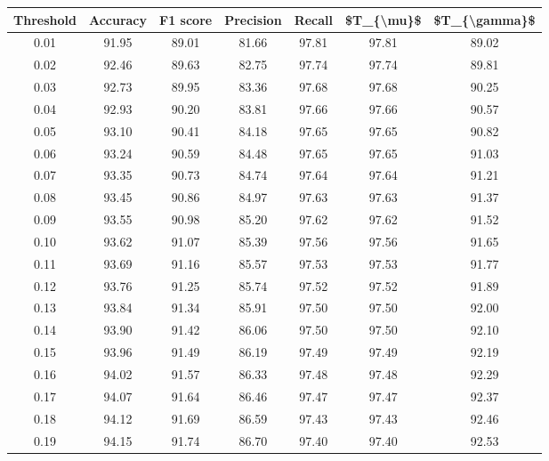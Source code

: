 \begin{tabular}{|c|c|c|c|c|c|c|}
\hline
 Threshold &  Accuracy &  F1 score &  Precision &  Recall &  \$T\_\{\textbackslash mu\}\$ &  \$T\_\{\textbackslash gamma\}\$ \\
\hline
      0.01 &     91.95 &     89.01 &      81.66 &   97.81 &      97.81 &         89.02 \\
      0.02 &     92.46 &     89.63 &      82.75 &   97.74 &      97.74 &         89.81 \\
      0.03 &     92.73 &     89.95 &      83.36 &   97.68 &      97.68 &         90.25 \\
      0.04 &     92.93 &     90.20 &      83.81 &   97.66 &      97.66 &         90.57 \\
      0.05 &     93.10 &     90.41 &      84.18 &   97.65 &      97.65 &         90.82 \\
      0.06 &     93.24 &     90.59 &      84.48 &   97.65 &      97.65 &         91.03 \\
      0.07 &     93.35 &     90.73 &      84.74 &   97.64 &      97.64 &         91.21 \\
      0.08 &     93.45 &     90.86 &      84.97 &   97.63 &      97.63 &         91.37 \\
      0.09 &     93.55 &     90.98 &      85.20 &   97.62 &      97.62 &         91.52 \\
      0.10 &     93.62 &     91.07 &      85.39 &   97.56 &      97.56 &         91.65 \\
      0.11 &     93.69 &     91.16 &      85.57 &   97.53 &      97.53 &         91.77 \\
      0.12 &     93.76 &     91.25 &      85.74 &   97.52 &      97.52 &         91.89 \\
      0.13 &     93.84 &     91.34 &      85.91 &   97.50 &      97.50 &         92.00 \\
      0.14 &     93.90 &     91.42 &      86.06 &   97.50 &      97.50 &         92.10 \\
      0.15 &     93.96 &     91.49 &      86.19 &   97.49 &      97.49 &         92.19 \\
      0.16 &     94.02 &     91.57 &      86.33 &   97.48 &      97.48 &         92.29 \\
      0.17 &     94.07 &     91.64 &      86.46 &   97.47 &      97.47 &         92.37 \\
      0.18 &     94.12 &     91.69 &      86.59 &   97.43 &      97.43 &         92.46 \\
      0.19 &     94.15 &     91.74 &      86.70 &   97.40 &      97.40 &         92.53 \\

\end{tabular}
